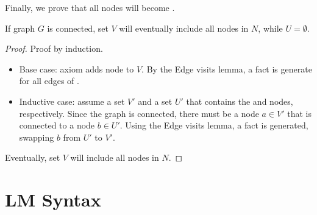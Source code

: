 Finally, we prove that all nodes will become .

\begin{theorem}
If graph $G$ is connected, set $V$ will eventually include all nodes in $N$,
while $U = \emptyset$.
\end{theorem}
\begin{proof}
Proof by induction.

\begin{itemize}
   \item Base case: axiom  adds node  to $V$. By
   the Edge visits lemma, a  fact is generate for all edges of
   .
   \item Inductive case: assume a set $V'$ and a set $U'$ that contains the
    and  nodes, respectively. Since the graph
   is connected, there must be a node $a \in V'$ that is connected to a node $b
   \in U'$. Using the Edge visits lemma, a  fact is generated,
   swapping $b$ from $U'$ to $V'$.
\end{itemize}

Eventually, set $V$ will include all nodes in $N$.
\end{proof}

\section{LM Syntax}

